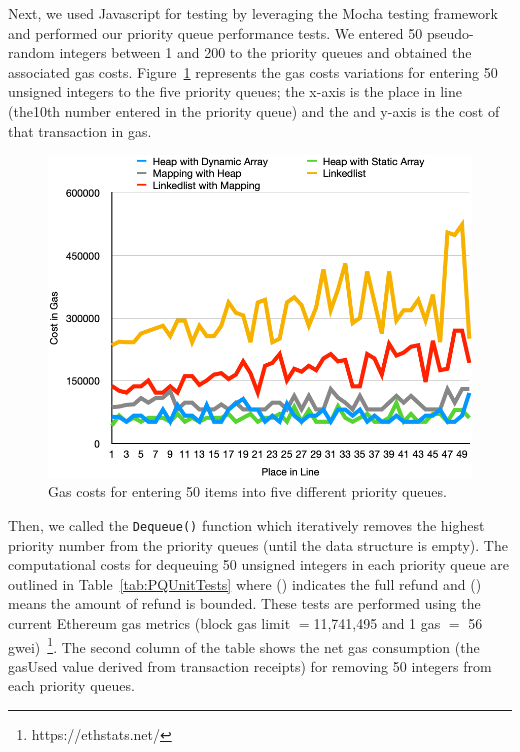 

Next, we used Javascript for testing by leveraging the Mocha testing framework and performed our priority queue performance tests. We entered 50 pseudo-random integers between 1 and 200 to the priority queues and obtained the associated gas costs. Figure~\ref{fig:random_insertion} represents the gas costs variations for entering 50 unsigned integers to the five priority queues; the x-axis is the place in line (\eg the10th number entered in the priority queue) and the and y-axis is the cost of that transaction in gas.


\begin{figure}[htb!p]
\centering
\includegraphics[width=1\textwidth]{fig/random_insertion.png}
\caption{\footnotesize{Gas costs for entering 50 items into five different priority queues.}  \label{fig:random_insertion}}
\end{figure}


Then, we called the \texttt{Dequeue()} function which iteratively removes the highest priority number from the priority queues (until the data structure is empty). The computational costs for dequeuing 50 unsigned integers in each priority queue are outlined in Table~\ref{tab:PQUnitTests} where (\full) indicates the full refund and (\prt) means the amount of refund is bounded. These tests are performed using the current Ethereum gas metrics (block gas limit $=$11,741,495 and 1 gas $=$ 56 gwei)~\footnote{https://ethstats.net/}. The second column of the table shows the net gas consumption (the gasUsed value derived from transaction receipts) for removing 50 integers from each priority queues.  

